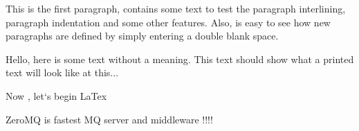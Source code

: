 \documentclass{report}
\begin{document}
This is the first paragraph, contains some text to test the paragraph
interlining, paragraph indentation and some other features. Also, is 
easy to see how new paragraphs are defined by simply entering a double 
blank space.
 
Hello,  here  is  some  text  without  a  meaning.   This  text  should
show what a printed text will look like at this... 

\clearpage
Now , let`s begin LaTex

\newpage
ZeroMQ is fastest MQ server and middleware !!!!
\end{document}
